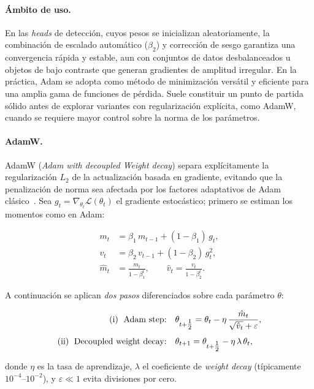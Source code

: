 \paragraph{Ámbito de uso.}
En las \emph{heads} de detección, cuyos pesos se inicializan aleatoriamente, la combinación de escalado automático (\(\beta_2\)) y corrección de sesgo garantiza una convergencia rápida y estable, aun con conjuntos de datos desbalanceados u objetos de bajo contraste que generan gradientes de amplitud irregular.
En la práctica, Adam se adopta como método de minimización versátil y eficiente para una amplia gama de funciones de pérdida. Suele constituir un punto de partida sólido antes de explorar variantes con regularización explícita, como AdamW, cuando se requiere mayor control sobre la norma de los parámetros.

\paragraph{AdamW.}

AdamW (\emph{Adam with decoupled Weight decay}) separa explícitamente la regularización \(L_2\) de la actualización basada en gradiente, evitando que la penalización de norma sea afectada por los factores adaptativos de Adam clásico~\cite{loshchilov2019adamw}.
Sea \(g_t=\nabla_{\theta_t}\mathcal{L}(\theta_t)\) el gradiente estocástico; primero se estiman los momentos como en Adam:

\[
\begin{aligned}
m_t &= \beta_1\,m_{t-1} + (1-\beta_1)\,g_t,\\
v_t &= \beta_2\,v_{t-1} + (1-\beta_2)\,g_t^{2},\\[2pt]
\hat{m}_t &= \frac{m_t}{1-\beta_1^{t}}, \qquad
\hat{v}_t = \frac{v_t}{1-\beta_2^{t}}.
\end{aligned}
\]

A continuación se aplican \emph{dos pasos} diferenciados sobre cada parámetro \(\theta\):

\[
\begin{aligned}
\text{(i) \;Adam step:} & \quad
\theta_{t+\tfrac12} = \theta_t - \eta\,\frac{\hat{m}_t}{\sqrt{\hat{v}_t} + \varepsilon}, \\[4pt]
\text{(ii) \;Decoupled weight decay:} & \quad
\theta_{t+1} = \theta_{t+\tfrac12} - \eta\,\lambda\,\theta_t,
\end{aligned}
\]

donde \(\eta\) es la tasa de aprendizaje, \(\lambda\) el coeficiente de \emph{weight decay} (típicamente \(10^{-4}\!\text{–}\!10^{-2}\)), y \(\varepsilon\!\ll\!1\) evita divisiones por cero.


